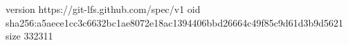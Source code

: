 version https://git-lfs.github.com/spec/v1
oid sha256:a5aece1cc3c6632bc1ae8072e18ac1394406bbd26664c49f85c9d61d3b9d5621
size 332311
